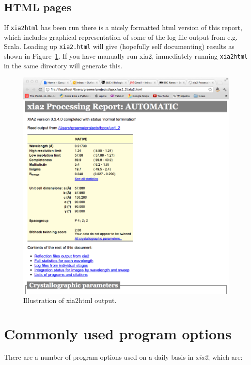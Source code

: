 \documentclass[a4paper, 11pt]{article}
\begin{document}
\subsection{HTML pages}

If \verb|xia2html| has been run there is a nicely formatted html
version of this report, which includes graphical representation of
some of the log file output from e.g. Scala. Loading up
\verb|xia2.html| will give (hopefully self documenting) results as
shown in Figure~\ref{figure-xia2html}. If you have manually run xia2,
immediately running \verb|xia2html| in the same directory will generate this.

\begin{figure}
\caption{Illustration of xia2html output.\label{figure-xia2html}}
\begin{center}
\includegraphics[scale=0.25]{figures/xia2html.png}
\end{center}
\end{figure}

\section{Commonly used program options}

There are a number of program options used on a daily basis in 
\emph{xia2}, which are:
\end{document}
